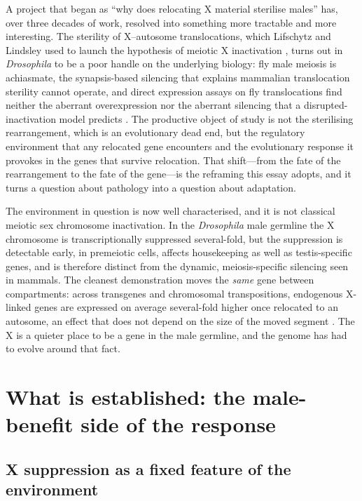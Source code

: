 \documentclass[11pt,a4paper]{article}
\begin{document}
A project that began as ``why does relocating X material sterilise males'' has, over three decades of work, resolved into something more tractable and more interesting. The sterility of X--autosome translocations, which Lifschytz and Lindsley used to launch the hypothesis of meiotic X inactivation \citep{ll1972}, turns out in \emph{Drosophila} to be a poor handle on the underlying biology: fly male meiosis is achiasmate, the synapsis-based silencing that explains mammalian translocation sterility cannot operate, and direct expression assays on fly translocations find neither the aberrant overexpression nor the aberrant silencing that a disrupted-inactivation model predicts \citep{landeen2016}. The productive object of study is not the sterilising rearrangement, which is an evolutionary dead end, but the regulatory environment that any relocated gene encounters and the evolutionary response it provokes in the genes that survive relocation. That shift---from the fate of the rearrangement to the fate of the gene---is the reframing this essay adopts, and it turns a question about pathology into a question about adaptation.

The environment in question is now well characterised, and it is not classical meiotic sex chromosome inactivation. In the \emph{Drosophila} male germline the X chromosome is transcriptionally suppressed several-fold, but the suppression is detectable early, in premeiotic cells, affects housekeeping as well as testis-specific genes, and is therefore distinct from the dynamic, meiosis-specific silencing seen in mammals. The cleanest demonstration moves the \emph{same} gene between compartments: across transgenes and chromosomal transpositions, endogenous X-linked genes are expressed on average several-fold higher once relocated to an autosome, an effect that does not depend on the size of the moved segment \citep{landeen2016}. The X is a quieter place to be a gene in the male germline, and the genome has had to evolve around that fact.

\section{What is established: the male-benefit side of the response}

\subsection{X suppression as a fixed feature of the environment}
\end{document}
